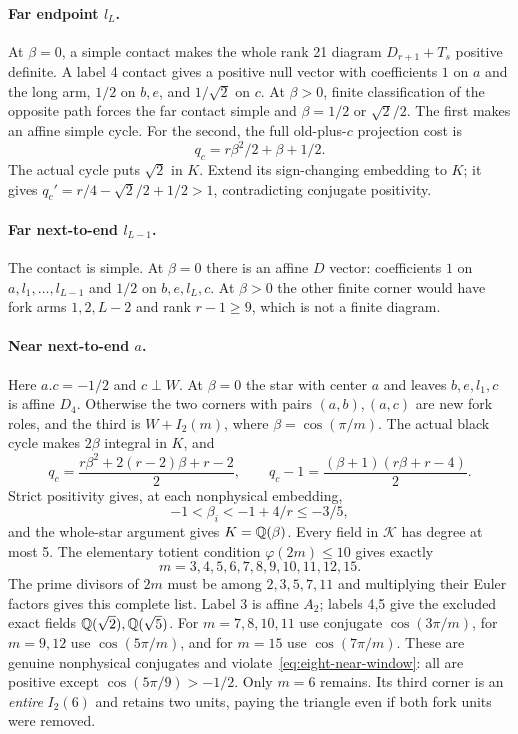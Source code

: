 \paragraph{Far endpoint $l_L$.}
At $\beta=0$, a simple contact makes the whole rank 21 diagram
$D_{r+1}+T_s$ positive definite. A label 4 contact gives a positive null
vector with coefficients $1$ on $a$ and the long arm, $1/2$ on
$b,e$, and $1/\sqrt2$ on $c$. At $\beta>0$, finite classification
of the opposite path forces the far contact simple and
$\beta=1/2$ or $\sqrt2/2$. The first makes an affine simple cycle.
For the second, the full old-plus-$c$ projection cost is
\[
 q_c=r\beta^2/2+\beta+1/2.
\]
The actual cycle puts $\sqrt2$ in $K$. Extend its sign-changing
embedding to $K$; it gives
$q_c'=r/4-\sqrt2/2+1/2>1$, contradicting conjugate positivity.

\paragraph{Far next-to-end $l_{L-1}$.}
The contact is simple. At $\beta=0$ there is an affine $D$
vector: coefficients $1$ on $a,l_1,\ldots,l_{L-1}$ and $1/2$
on $b,e,l_L,c$. At $\beta>0$ the other finite corner would
have fork arms $1,2,L-2$ and rank $r-1\ge9$, which is not a
finite diagram.

\paragraph{Near next-to-end $a$.}
Here $a.c=-1/2$ and $c\perp W$. At $\beta=0$ the star with
center $a$ and leaves $b,e,l_1,c$ is affine $D_4$. Otherwise
the two corners with pairs $(a,b),(a,c)$ are new fork roles, and
the third is $W+I_2(m)$, where $\beta=\cos(\pi/m)$.
The actual black cycle makes $2\beta$ integral in $K$, and
\[
 q_c=\frac{r\beta^2+2(r-2)\beta+r-2}{2},\qquad
 q_c-1=\frac{(\beta+1)(r\beta+r-4)}2.
\]
Strict positivity gives, at each nonphysical embedding,
\begin{equation}\label{eq:eight-near-window}
 -1<\beta_i<-1+4/r\le-3/5,
\end{equation}
and the whole-star argument gives $K=\mathbb Q(\beta)$.
Every field in $\mathcal K$ has degree at most 5. The elementary
totient condition $\varphi(2m)\le10$ gives exactly
\[
 m=3,4,5,6,7,8,9,10,11,12,15.
\]
The prime divisors of $2m$ must be among $2,3,5,7,11$ and
multiplying their Euler factors gives this complete list.
Label 3 is affine $A_2$; labels 4,5 give the excluded exact fields
$\mathbb Q(\sqrt2),\mathbb Q(\sqrt5)$. For $m=7,8,10,11$ use conjugate
$\cos(3\pi/m)$, for $m=9,12$ use $\cos(5\pi/m)$, and for
$m=15$ use $\cos(7\pi/m)$. These are genuine nonphysical
conjugates and violate~\eqref{eq:eight-near-window}: all are
positive except $\cos(5\pi/9)>-1/2$. Only $m=6$ remains.
Its third corner is an \emph{entire} $I_2(6)$ and retains two
units, paying the triangle even if both fork units were removed.

